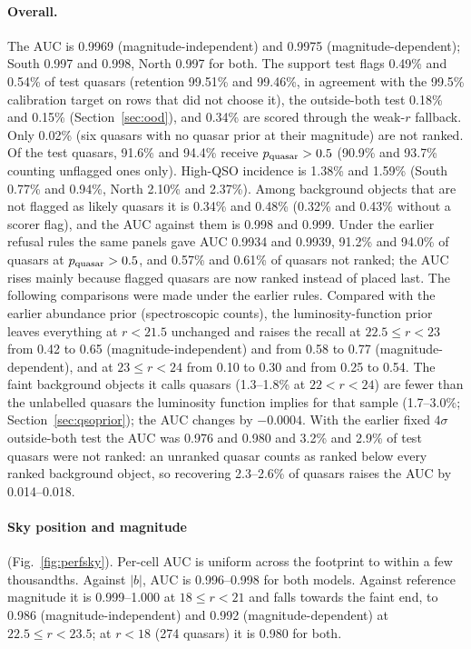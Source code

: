 \documentclass[11pt,a4paper]{article}
\begin{document}
\paragraph{Overall.} The AUC is 0.9969 (magnitude-independent) and 0.9975 (magnitude-dependent); South
0.997 and 0.998, North 0.997 for both. The support test flags 0.49\% and 0.54\% of test quasars (retention
99.51\% and 99.46\%, in agreement with the 99.5\% calibration target on rows that did not choose it), the
outside-both test 0.18\% and 0.15\% (Section~\ref{sec:ood}), and 0.34\% are scored through the weak-$r$ fallback.
Only 0.02\% (six quasars with no quasar prior at their magnitude) are not ranked. Of the test quasars, 91.6\% and
94.4\% receive $p_{\rm quasar}>0.5$ (90.9\% and 93.7\% counting unflagged ones only). High-QSO incidence is 1.38\%
and 1.59\% (South 0.77\% and 0.94\%, North 2.10\% and 2.37\%). Among background objects that are not flagged as
likely quasars it is 0.34\% and 0.48\% (0.32\% and 0.43\% without a scorer flag), and the AUC against them is
0.998 and 0.999. Under the earlier refusal rules the same panels gave AUC 0.9934 and 0.9939, 91.2\% and 94.0\% of
quasars at $p_{\rm quasar}>0.5$, and 0.57\% and 0.61\% of quasars not ranked; the AUC rises mainly because flagged
quasars are now ranked instead of placed last. The following comparisons were made under the earlier rules.
Compared with the earlier abundance prior (spectroscopic counts),
the luminosity-function prior leaves everything at $r<21.5$ unchanged and raises the recall at $22.5\le r<23$
from 0.42 to 0.65 (magnitude-independent) and from 0.58 to 0.77 (magnitude-dependent), and at $23\le r<24$ from
0.10 to 0.30 and from 0.25 to 0.54. The faint background objects it calls quasars (1.3--1.8\% at $22<r<24$) are
fewer than the unlabelled quasars the luminosity function implies for that sample (1.7--3.0\%;
Section~\ref{sec:qsoprior}); the AUC changes by $-0.0004$. With the earlier fixed $4\sigma$ outside-both test the AUC was
0.976 and 0.980 and 3.2\% and 2.9\% of test quasars were not ranked: an unranked quasar counts as ranked below
every ranked background object, so recovering 2.3--2.6\% of quasars raises the AUC by 0.014--0.018.

\paragraph{Sky position and magnitude} (Fig.~\ref{fig:perfsky}). Per-cell AUC is uniform across the
footprint to within a few thousandths. Against $|b|$, AUC is 0.996--0.998 for both models. Against reference
magnitude it is 0.999--1.000 at $18\le r<21$ and falls towards the faint end, to 0.986 (magnitude-independent) and
0.992 (magnitude-dependent) at $22.5\le r<23.5$; at $r<18$ (274 quasars) it is 0.980 for both.
\end{document}
